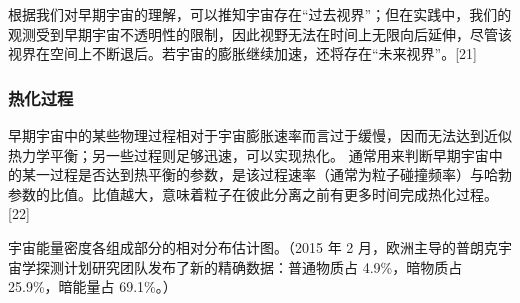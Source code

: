根据我们对早期宇宙的理解，可以推知宇宙存在“过去视界”；但在实践中，我们的观测受到早期宇宙不透明性的限制，因此视野无法在时间上无限向后延伸，尽管该视界在空间上不断退后。若宇宙的膨胀继续加速，还将存在“未来视界”。[21]
\subsubsection{热化过程}
早期宇宙中的某些物理过程相对于宇宙膨胀速率而言过于缓慢，因而无法达到近似热力学平衡；另一些过程则足够迅速，可以实现热化。  
通常用来判断早期宇宙中的某一过程是否达到热平衡的参数，是该过程速率（通常为粒子碰撞频率）与哈勃参数的比值。比值越大，意味着粒子在彼此分离之前有更多时间完成热化过程。[22]

宇宙能量密度各组成部分的相对分布估计图。（2015 年 2 月，欧洲主导的普朗克宇宙学探测计划研究团队发布了新的精确数据：普通物质占 4.9\%，暗物质占 25.9\%，暗能量占 69.1\%。）



